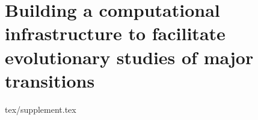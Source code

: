 \chapter{Building a computational infrastructure to facilitate evolutionary studies of major transitions}
\label{ch:infrastructure-appendix}

{tex/supplement.tex}


